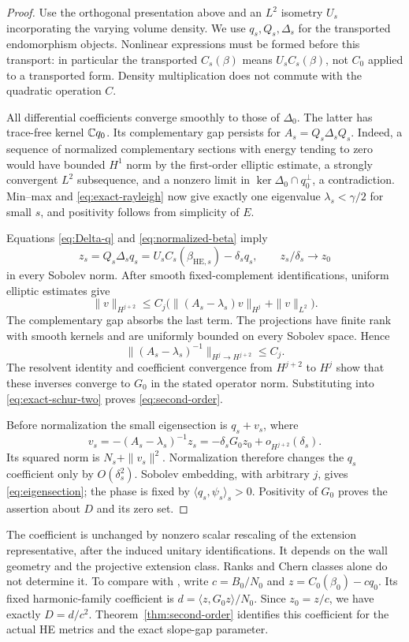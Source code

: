 \begin{proof}
Use the orthogonal presentation above and an $L^2$ isometry $U_s$
incorporating the varying volume density. We use $q_s,Q_s,\Delta_s$
for the transported endomorphism objects. Nonlinear expressions must
be formed before this transport: in particular the transported
$C_s(\beta)$ means $U_sC_s(\beta)$, not $C_0$ applied to a
transported form. Density multiplication does not commute with the
quadratic operation $C$.

All differential coefficients converge smoothly to those of $\Delta_0$.
The latter has trace-free kernel $\mathbb C q_0$. Its complementary gap
persists for $A_s=Q_s\Delta_sQ_s$. Indeed, a sequence of normalized
complementary sections with energy tending to zero would have bounded
$H^1$ norm by the first-order elliptic estimate, a strongly convergent
$L^2$ subsequence, and a nonzero limit in
$\ker\Delta_0\cap q_0^\perp$, a contradiction.
Min--max and \eqref{eq:exact-rayleigh} now give exactly one eigenvalue
$\lambda_s<\gamma/2$ for small $s$, and positivity follows from
simplicity of $E$.

Equations \eqref{eq:Delta-q} and \eqref{eq:normalized-beta} imply
\[
 z_s=Q_s\Delta_sq_s=U_sC_s(\beta_{\mathrm{HE},s})-\delta_sq_s,
 \qquad z_s/\delta_s\longrightarrow z_0
\]
in every Sobolev norm. After smooth fixed-complement identifications,
uniform elliptic estimates give
\[
 \|v\|_{H^{j+2}}\le C_j\bigl(\|(A_s-\lambda_s)v\|_{H^j}
                                      +\|v\|_{L^2}\bigr).
\]
The complementary gap absorbs the last term. The projections have
finite rank with smooth kernels and are uniformly bounded on every
Sobolev space. Hence
\[
 \|(A_s-\lambda_s)^{-1}\|_{H^j\to H^{j+2}}\le C_j.
\]
The resolvent identity and coefficient convergence from $H^{j+2}$
to $H^j$ show that these inverses converge to $G_0$ in the stated
operator norm. Substituting into \eqref{eq:exact-schur-two} proves
\eqref{eq:second-order}.

Before normalization the small eigensection is $q_s+v_s$, where
\[
 v_s=-(A_s-\lambda_s)^{-1}z_s
     =-\delta_sG_0z_0+o_{H^{j+2}}(\delta_s).
\]
Its squared norm is $N_s+\|v_s\|^2$. Normalization therefore changes
the $q_s$ coefficient only by $O(\delta_s^2)$. Sobolev embedding,
with arbitrary $j$, gives \eqref{eq:eigensection}; the phase is fixed
by $\langle q_s,\psi_s\rangle_s>0$. Positivity of $G_0$ proves
the assertion about $D$ and its zero set.
\end{proof}

The coefficient is unchanged by nonzero scalar rescaling of the
extension representative, after the induced unitary identifications.
It depends on the wall geometry and the projective extension class.
Ranks and Chern classes alone do not determine it. To compare with
\cite{Flow}, write $c=B_0/N_0$ and
$z=C_0(\beta_0)-cq_0$. Its fixed harmonic-family coefficient is
$d=\langle z,G_0z\rangle/N_0$. Since $z_0=z/c$, we have exactly
$D=d/c^2$. Theorem~\ref{thm:second-order} identifies this coefficient
for the actual HE metrics and the exact slope-gap parameter.
